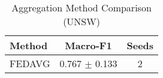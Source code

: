 \begin{table}[htbp]
\centering
\caption{Aggregation Method Comparison (UNSW)}\label{tab:agg_unsw}
\begin{tabular}{lcc}
\toprule
Method & Macro-F1 & Seeds \\
\midrule
FEDAVG & 0.767 $\pm$ 0.133 & 2 \\
\bottomrule
\end{tabular}
\end{table}
